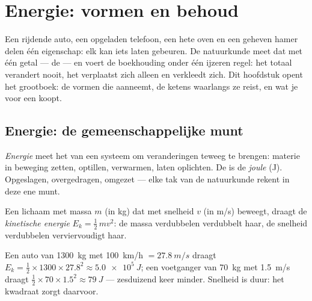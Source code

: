 \chapter{Energie: vormen en behoud}\label{ch:g10:energy-conservation}

Een rijdende auto, een opgeladen telefoon, een hete oven en een geheven
hamer delen één eigenschap: elk kan iets laten gebeuren. De natuurkunde
meet dat  met één getal --- de  --- en voert de
boekhouding onder één ijzeren regel: het totaal verandert nooit, het
verplaatst zich alleen en verkleedt zich. Dit hoofdstuk opent het
grootboek: de vormen die  aanneemt, de ketens waarlangs ze reist,
en wat je voor een  koopt.

\section{Energie: de gemeenschappelijke munt}

\begin{definition}\label{def:g10:energy-conservation:energy}
\emph{Energie} meet het  van een systeem om
veranderingen teweeg te brengen: materie in beweging zetten, optillen,
verwarmen, laten oplichten. De  is de \emph{joule}
(\unit{J}). Opgeslagen, overgedragen, omgezet --- elke tak van de
natuurkunde rekent in deze ene munt.
\end{definition}

\begin{definition}\label{def:g10:energy-conservation:kinetic}
Een lichaam met massa $m$ (in \unit{kg}) dat met snelheid $v$ (in
\unit{m/s}) beweegt, draagt de \emph{kinetische
energie} $E_k = \tfrac12\, m v^2$: de massa
verdubbelen verdubbelt haar, de snelheid verdubbelen verviervoudigt
haar.
\end{definition}

\begin{example}\label{ex:g10:energy-conservation:kinetic}
Een auto van \qty{1300}{kg} met \qty{100}{km/h} $= \qty{27.8}{m/s}$
draagt $E_k = \tfrac12 \times 1300 \times 27.8^2 \approx
\qty{5.0e5}{J}$; een voetganger van \qty{70}{kg} met \qty{1.5}{m/s}
draagt $\tfrac12 \times 70 \times 1.5^2 \approx \qty{79}{J}$ --- zesduizend
keer minder. Snelheid is duur: het kwadraat zorgt daarvoor.
\end{example}

